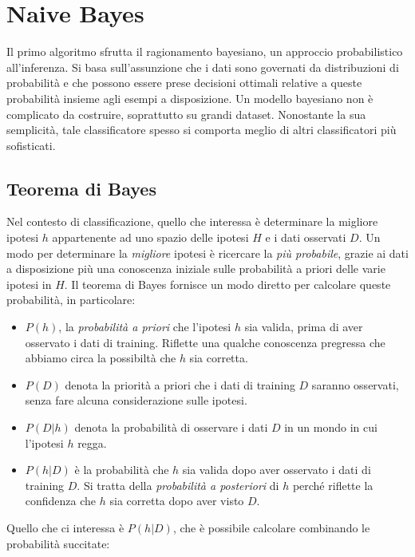 \chapter{Naive Bayes}
\label{ch:bayes}

Il primo algoritmo sfrutta il ragionamento bayesiano, un approccio probabilistico all'inferenza. Si basa sull'assunzione che i dati sono governati da distribuzioni di probabilità e che possono essere prese decisioni ottimali relative a queste probabilità insieme agli esempi a disposizione. Un modello bayesiano non è complicato da costruire, soprattutto su grandi dataset. Nonostante la sua semplicità, tale classificatore spesso si comporta meglio di altri classificatori più sofisticati\cite{Domingos:1997:OSB:274158.274160}.

\section{Teorema di Bayes}
Nel contesto di classificazione, quello che interessa è determinare la migliore ipotesi $h$ appartenente ad uno spazio delle ipotesi $H$ e i dati osservati $D$. Un modo per determinare la \emph{migliore} ipotesi è ricercare la \emph{più probabile}, grazie ai dati a disposizione più una conoscenza iniziale sulle probabilità a priori delle varie ipotesi in $H$\cite{Mitchell:1997:ML:541177}. Il teorema di Bayes fornisce un modo diretto per calcolare queste probabilità, in particolare:

\begin{itemize}
	\item $P(h)$, la \emph{probabilità a priori} che l'ipotesi $h$ sia valida, prima di aver osservato i dati di training. Riflette una qualche conoscenza pregressa che abbiamo circa la possibiltà che $h$ sia corretta.
	\item $P(D)$ denota la priorità a priori che i dati di training $D$ saranno osservati, senza fare alcuna considerazione sulle ipotesi.
	\item $P(D|h)$ denota la probabilità di osservare i dati $D$ in un mondo in cui l'ipotesi $h$ regga.
	\item $P(h|D)$ è la probabilità che $h$ sia valida dopo aver osservato i dati di training $D$. Si tratta della \emph{probabilità a posteriori} di $h$ perché riflette la confidenza che $h$ sia corretta dopo aver visto $D$.
\end{itemize}

Quello che ci interessa è $P(h|D)$, che è possibile calcolare combinando le probabilità succitate:

